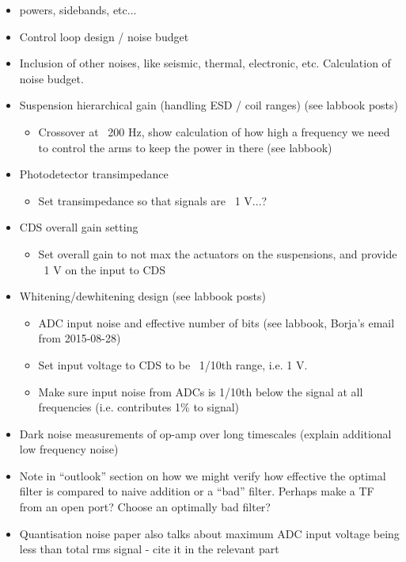 \begin{itemize}
  \item powers, sidebands, etc...
  \item Control loop design / noise budget
  \item Inclusion of other noises, like seismic, thermal, electronic, etc. Calculation of noise budget.
  \item Suspension hierarchical gain (handling ESD / coil ranges) (see labbook posts)
     \begin{itemize}
        \item Crossover at ~200 Hz, show calculation of how high a frequency we need to control the arms to keep the power in there (see labbook)
     \end{itemize}
  \item Photodetector transimpedance
    \begin{itemize}
      \item Set transimpedance so that signals are ~1 V...?
    \end{itemize}
  \item CDS overall gain setting
    \begin{itemize}
      \item Set overall gain to not max the actuators on the suspensions, and provide ~1 V on the input to CDS
    \end{itemize}
  \item Whitening/dewhitening design (see labbook posts)
    \begin{itemize}
      \item ADC input noise and effective number of bits (see labbook, Borja's email from 2015-08-28)
      \item Set input voltage to CDS to be ~1/10th range, i.e. 1 V.
      \item Make sure input noise from ADCs is 1/10th below the signal at all frequencies (i.e. contributes 1\% to signal)
    \end{itemize}
  \item Dark noise measurements of op-amp over long timescales (explain additional low frequency noise)
  \item Note in ``outlook'' section on how we might verify how effective the optimal filter is compared to naive addition or a ``bad'' filter. Perhaps make a TF from an open port? Choose an optimally bad filter?
  \item Quantisation noise paper also talks about maximum ADC input voltage being less than total rms signal - cite it in the relevant part
\end{itemize}

